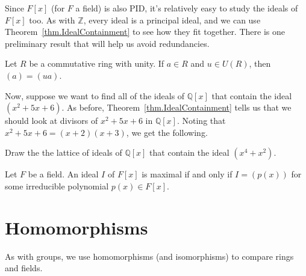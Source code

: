 Since $F[x]$ (for $F$ a field) is also PID, it's relatively easy to study the ideals of $F[x]$ too. As with $\mathbb{Z}$, every ideal is a principal ideal, and we can use Theorem~\ref{thm.IdealContainment} to see how they fit together. There is one preliminary result that will help us avoid redundancies.

\begin{theorem}\label{thm.DifferByUnitSameIdeal}
Let $R$ be a commutative ring with unity. If $a \in R$ and $u\in U(R)$, then $(a) = (ua)$.
\end{theorem}

Now, suppose we want to find all of the ideals of $\mathbb{Q}[x]$ that contain the ideal $(x^2+5x+6)$. As before, Theorem~\ref{thm.IdealContainment} tells us that we should look at divisors of $x^2+5x+6$ in $\mathbb{Q}[x]$. Noting that $x^2+5x+6 =  (x+2)(x+3)$, we get the following. 
\begin{center}
\end{center}


\begin{problem}
Draw the the lattice of ideals of $\mathbb{Q}[x]$ that contain the ideal $(x^4 +x^2)$.
\end{problem}

\begin{theorem}\label{thm.MaximalIFFIrreducibleinFx}
Let $F$ be a field. An ideal $I$ of $F[x]$ is maximal if and only if $I=(p(x))$ for some irreducible polynomial $p(x)\in F[x]$.
\end{theorem}



\section{Homomorphisms}
As with groups, we use homomorphisms (and isomorphisms) to compare rings and fields.

